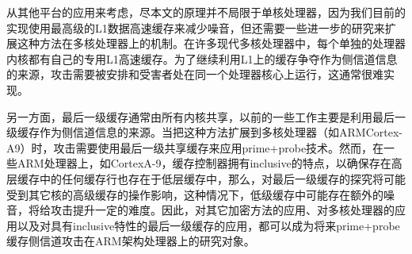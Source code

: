 从其他平台的应用来考虑，尽本文的原理并不局限于单核处理器，因为我们目前的实现使用最高级的L1数据高速缓存来减少噪音，但还需要一些进一步的研究来扩展这种方法在多核处理器上的机制。在许多现代多核处理器中，每个单独的处理器内核都有自己的专用L1高速缓存。为了继续利用L1上的缓存争夺作为侧信道信息的来源，攻击需要被安排和受害者处在同一个处理器核心上运行，这通常很难实现。

另一方面，最后一级缓存通常由所有内核共享，以前的一些工作主要是利用最后一级缓存作为侧信道信息的来源\cite{irazoqui2015s,liu2015last,ristenpart2009hey}。当把这种方法扩展到多核处理器（如ARMCortex-A9）时，攻击需要使用最后一级共享缓存来应用prime+probe技术。然而，在一些ARM处理器上，如CortexA-9，缓存控制器拥有inclusive的特点，以确保存在高层缓存中的任何缓存行也存在于低层缓存中，那么，对最后一级缓存的探究将可能受到其它核的高级缓存的操作影响，这种情况下，低级缓存中可能存在额外的噪音，将给攻击提升一定的难度。因此，对其它加密方法的应用、对多核处理器的应用以及对具有inclusive特性的最后一级缓存的应用，都可以成为将来prime+probe缓存侧信道攻击在ARM架构处理器上的研究对象。

